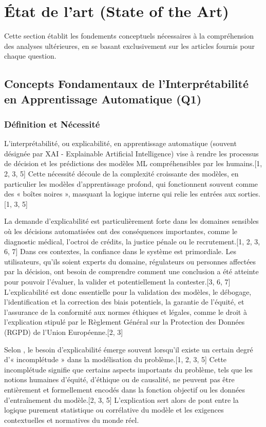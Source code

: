 \documentclass[11pt,a4paper]{article}
\begin{document}
\section{État de l'art (State of the Art)}

Cette section établit les fondements conceptuels nécessaires à la compréhension des analyses ultérieures, en se basant exclusivement sur les articles fournis pour chaque question.

\subsection{Concepts Fondamentaux de l'Interprétabilité en Apprentissage Automatique (Q1)}

\subsubsection{Définition et Nécessité}
L'interprétabilité, ou explicabilité, en apprentissage automatique (souvent désignée par XAI - Explainable Artificial Intelligence) vise à rendre les processus de décision et les prédictions des modèles ML compréhensibles par les humains.[1, 2, 3, 5] Cette nécessité découle de la complexité croissante des modèles, en particulier les modèles d'apprentissage profond, qui fonctionnent souvent comme des « boîtes noires », masquant la logique interne qui relie les entrées aux sorties.[1, 3, 5]

La demande d'explicabilité est particulièrement forte dans les domaines sensibles où les décisions automatisées ont des conséquences importantes, comme le diagnostic médical, l'octroi de crédits, la justice pénale ou le recrutement.[1, 2, 3, 6, 7] Dans ces contextes, la confiance dans le système est primordiale. Les utilisateurs, qu'ils soient experts du domaine, régulateurs ou personnes affectées par la décision, ont besoin de comprendre comment une conclusion a été atteinte pour pouvoir l'évaluer, la valider et potentiellement la contester.[3, 6, 7] L'explicabilité est donc essentielle pour la validation des modèles, le débogage, l'identification et la correction des biais potentiels, la garantie de l'équité, et l'assurance de la conformité aux normes éthiques et légales, comme le droit à l'explication stipulé par le Règlement Général sur la Protection des Données (RGPD) de l'Union Européenne.[2, 3]

Selon \citet{Burkart2021}, le besoin d'explicabilité émerge souvent lorsqu'il existe un certain degré d'« incomplétude » dans la modélisation du problème.[1, 2, 3, 5] Cette incomplétude signifie que certains aspects importants du problème, tels que les notions humaines d'équité, d'éthique ou de causalité, ne peuvent pas être entièrement et formellement encodés dans la fonction objectif ou les données d'entraînement du modèle.[2, 3, 5] L'explication sert alors de pont entre la logique purement statistique ou corrélative du modèle et les exigences contextuelles et normatives du monde réel.
\end{document}
